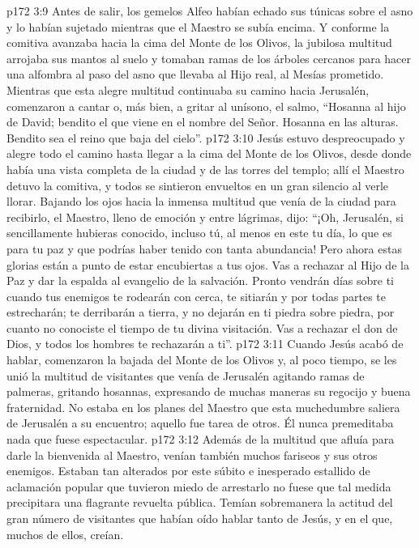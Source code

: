 \vs p172 3:9 Antes de salir, los gemelos Alfeo habían echado sus túnicas sobre el asno y lo habían sujetado mientras que el Maestro se subía encima. Y conforme la comitiva avanzaba hacia la cima del Monte de los Olivos, la jubilosa multitud arrojaba sus mantos al suelo y tomaban ramas de los árboles cercanos para hacer una alfombra al paso del asno que llevaba al Hijo real, al Mesías prometido. Mientras que esta alegre multitud continuaba su camino hacia Jerusalén, comenzaron a cantar o, más bien, a gritar al unísono, el salmo, “Hosanna al hijo de David; bendito el que viene en el nombre del Señor. Hosanna en las alturas. Bendito sea el reino que baja del cielo”.
\vs p172 3:10 Jesús estuvo despreocupado y alegre todo el camino hasta llegar a la cima del Monte de los Olivos, desde donde había una vista completa de la ciudad y de las torres del templo; allí el Maestro detuvo la comitiva, y todos se sintieron envueltos en un gran silencio al verle llorar. Bajando los ojos hacia la inmensa multitud que venía de la ciudad para recibirlo, el Maestro, lleno de emoción y entre lágrimas, dijo: “¡Oh, Jerusalén, si sencillamente hubieras conocido, incluso tú, al menos en este tu día, lo que es para tu paz y que podrías haber tenido con tanta abundancia! Pero ahora estas glorias están a punto de estar encubiertas a tus ojos. Vas a rechazar al Hijo de la Paz y dar la espalda al evangelio de la salvación. Pronto vendrán días sobre ti cuando tus enemigos te rodearán con cerca, te sitiarán y por todas partes te estrecharán; te derribarán a tierra, y no dejarán en ti piedra sobre piedra, por cuanto no conociste el tiempo de tu divina visitación. Vas a rechazar el don de Dios, y todos los hombres te rechazarán a ti”.
\vs p172 3:11 Cuando Jesús acabó de hablar, comenzaron la bajada del Monte de los Olivos y, al poco tiempo, se les unió la multitud de visitantes que venía de Jerusalén agitando ramas de palmeras, gritando hosannas, expresando de muchas maneras su regocijo y buena fraternidad. No estaba en los planes del Maestro que esta muchedumbre saliera de Jerusalén a su encuentro; aquello fue tarea de otros. Él nunca premeditaba nada que fuese espectacular.
\vs p172 3:12 Además de la multitud que afluía para darle la bienvenida al Maestro, venían también muchos fariseos y sus otros enemigos. Estaban tan alterados por este súbito e inesperado estallido de aclamación popular que tuvieron miedo de arrestarlo no fuese que tal medida precipitara una flagrante revuelta pública. Temían sobremanera la actitud del gran número de visitantes que habían oído hablar tanto de Jesús, y en el que, muchos de ellos, creían.
